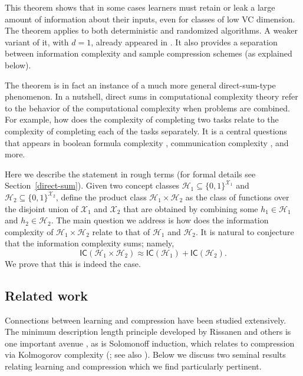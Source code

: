\documentclass[final,12pt]{colt2018}
\newcommand{\mc}[1]{\mathcal{#1}}
\newcommand{\cH}{\mc{H}}
\newcommand{\cX}{\mc{X}}
\newcommand{\IC}{\mathsf{IC}}
\begin{document}
This theorem shows that in some cases learners must retain or leak a large amount of information about their inputs, even for classes of low VC dimension. The theorem applies to both deterministic and randomized algorithms. A weaker variant of it, with $d=1$, already appeared in \cite{bassily2018learners}. It also provides a separation between information complexity and sample compression schemes (as explained below).

The theorem is in fact an instance of a much more general direct-sum-type phenomenon. In a nutshell, direct sums in computational complexity theory refer
to the behavior of the computational complexity when problems are combined. For example, how does the complexity of completing two tasks relate to the complexity of completing each of the tasks separately. It is a central questions that appears in boolean formula complexity \citep[see e.g.][]{karchmer1995super}, communication complexity \citep[see e.g.\ Section 4.1 in][]{kushilevitz1997communication}, and more.

Here we describe the statement in rough terms (for formal details see Section~\ref{direct-sum}).
Given two concept classes $\cH_1 \subseteq \{0,1\}^{\cX_1}$
and $\cH_2 \subseteq \{0,1\}^{\cX_2}$, define the product class
$\cH_1 \times \cH_2$ as the class of functions over the disjoint union of $\cX_1$ and $\cX_2$
that are obtained by combining some $h_1 \in \cH_1$ and $h_2 \in \cH_2$.
The main question we address is how does the information complexity
of $\cH_1 \times \cH_2$ relate to that of $\cH_1$ and $\cH_2$.
It is natural to {conjecture} that the information complexity sums;
namely, $$\IC(\cH_1 \times \cH_2) \approx \IC(\cH_1) + \IC(\cH_2).$$
We prove that this is indeed the case.



\subsection*{Related work}\label{related_work}

Connections between learning and compression have been studied extensively. 
The minimum description length principle developed by Rissanen {and others} is one important avenue \citep{rissanen1978modeling, grunwald2007minimum}, as is Solomonoff induction, which relates to compression via Kolmogorov complexity (\citealt{solomonoff1964formalA, ming1997introduction}; see also \citealt{hutter2007universal}). Below we discuss two seminal results relating learning and compression which we find particularly pertinent.
\end{document}
